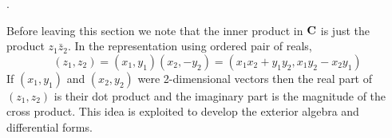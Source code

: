{\color{red}{Add Lagrange's identity}}.

Before leaving this section we note that the inner product in $\mathbf{C}$ is just
the product $z_1\bar{z}_2$. In the representation using ordered pair of reals,
\[
(z_1, z_2) = (x_1, y_1)(x_2, -y_2) = (x_1x_2 + y_1y_2, x_1y_2 - x_2y_1)
\]
If $(x_1, y_1)$ and $(x_2, y_2)$ were 2-dimensional vectors then the real part
of $(z_1, z_2)$ is their dot product and the imaginary part is the magnitude of
the cross product. This idea is exploited to develop the exterior algebra and
differential forms.
